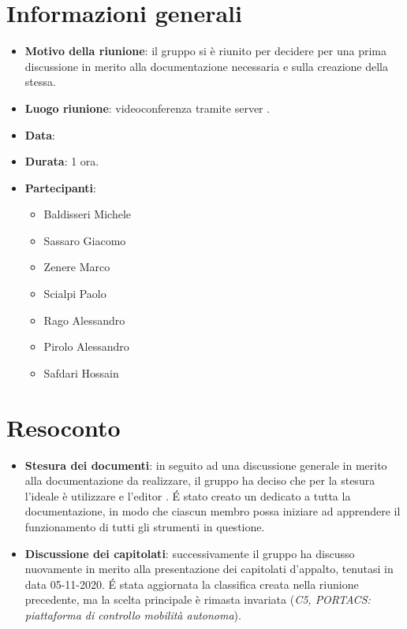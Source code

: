 \section{Informazioni generali}
\begin{itemize}
\item \textbf{Motivo della riunione}: il gruppo si è riunito per decidere per una prima discussione in merito alla documentazione necessaria e sulla creazione della stessa.
\item \textbf{Luogo riunione}: videoconferenza tramite server .
\item \textbf{Data}: \Data{}
\item \textbf{Durata}: 1 ora.
\item \textbf{Partecipanti}:
	\begin{itemize}
	\item Baldisseri Michele
	\item Sassaro Giacomo
	\item Zenere Marco
	\item Scialpi Paolo
	\item Rago Alessandro
	\item Pirolo Alessandro
	\item Safdari Hossain
	\end{itemize}
\end{itemize}
\newpage
\section{Resoconto}
\begin{itemize}
\item \textbf{Stesura dei documenti}: in seguito ad una discussione generale in merito alla documentazione da realizzare, il gruppo ha deciso che per la stesura l'ideale è utilizzare  e l'editor . \'E stato creato un  dedicato a tutta la documentazione, in modo che ciascun membro possa iniziare ad apprendere il funzionamento di tutti gli strumenti in questione.

\item \textbf{Discussione dei capitolati}: successivamente il gruppo ha discusso nuovamente in merito alla presentazione dei capitolati d'appalto, tenutasi in data 05-11-2020. \'E stata aggiornata la classifica creata nella riunione precedente, ma la scelta principale è rimasta invariata (\textit{C5, PORTACS: piattaforma di controllo mobilità autonoma}).
\end{itemize}